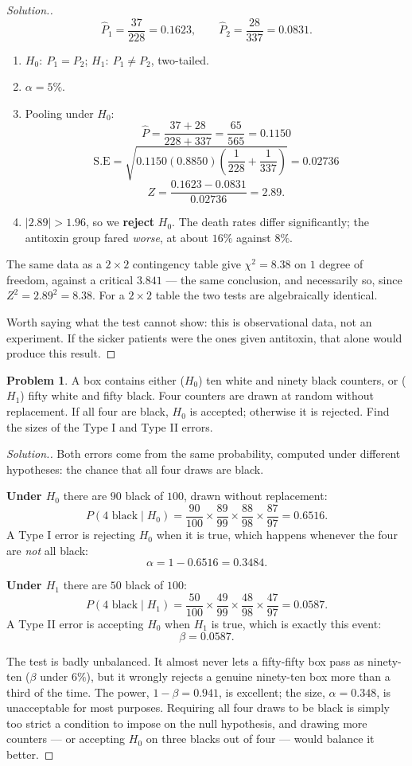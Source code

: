 \documentclass[11pt,a4paper]{article}
\theoremstyle{definition}
\newtheorem{problemx}{Problem}[section]
\newenvironment{problem}{\begin{problemx}}{\end{problemx}}
\newenvironment{solution}
  {\renewcommand{\qedsymbol}{}\begin{proof}[\textit{Solution}.]}
  {\end{proof}}
\begin{document}
\begin{solution}
\[\hat{P}_1=\frac{37}{228}=0.1623,\qquad \hat{P}_2=\frac{28}{337}=0.0831.\]
\begin{enumerate}
\item $H_0:\ P_1=P_2$; $H_1:\ P_1\neq P_2$, two-tailed.
\item $\alpha=5\%$.
\item Pooling under $H_0$:
\[\hat{P}=\frac{37+28}{228+337}=\frac{65}{565}=0.1150\]
\[\text{S.E}=\sqrt{0.1150(0.8850)\left(\frac{1}{228}+\frac{1}{337}\right)}=0.02736\]
\[Z=\frac{0.1623-0.0831}{0.02736}=2.89.\]
\item $|2.89|>1.96$, so we \textbf{reject} $H_0$. The death rates differ significantly; the
antitoxin group fared \emph{worse}, at about $16\%$ against $8\%$.
\end{enumerate}

The same data as a $2\times 2$ contingency table give $\chi^2=8.38$ on $1$ degree of freedom,
against a critical $3.841$ --- the same conclusion, and necessarily so, since
$Z^2=2.89^2=8.38$. For a $2\times 2$ table the two tests are algebraically identical.

Worth saying what the test cannot show: this is observational data, not an experiment. If
the sicker patients were the ones given antitoxin, that alone would produce this result.
\end{solution}

\begin{problem}
A box contains either ($H_0$) ten white and ninety black counters, or ($H_1$) fifty white and
fifty black. Four counters are drawn at random without replacement. If all four are black,
$H_0$ is accepted; otherwise it is rejected. Find the sizes of the Type I and Type II errors.
\end{problem}

\begin{solution}
Both errors come from the same probability, computed under different hypotheses: the chance
that all four draws are black.

\textbf{Under $H_0$} there are $90$ black of $100$, drawn without replacement:
\[P(\text{4 black}\mid H_0)=\frac{90}{100}\times\frac{89}{99}\times\frac{88}{98}\times\frac{87}{97}=0.6516.\]
A Type I error is rejecting $H_0$ when it is true, which happens whenever the four are
\emph{not} all black:
\[\alpha=1-0.6516=0.3484.\]

\textbf{Under $H_1$} there are $50$ black of $100$:
\[P(\text{4 black}\mid H_1)=\frac{50}{100}\times\frac{49}{99}\times\frac{48}{98}\times\frac{47}{97}=0.0587.\]
A Type II error is accepting $H_0$ when $H_1$ is true, which is exactly this event:
\[\beta=0.0587.\]

The test is badly unbalanced. It almost never lets a fifty-fifty box pass as
ninety-ten ($\beta$ under $6\%$), but it wrongly rejects a genuine ninety-ten box more than a
third of the time. The power, $1-\beta=0.941$, is excellent; the size, $\alpha=0.348$, is
unacceptable for most purposes. Requiring all four draws to be black is simply too strict a
condition to impose on the null hypothesis, and drawing more counters --- or accepting $H_0$
on three blacks out of four --- would balance it better.
\end{solution}
\end{document}

